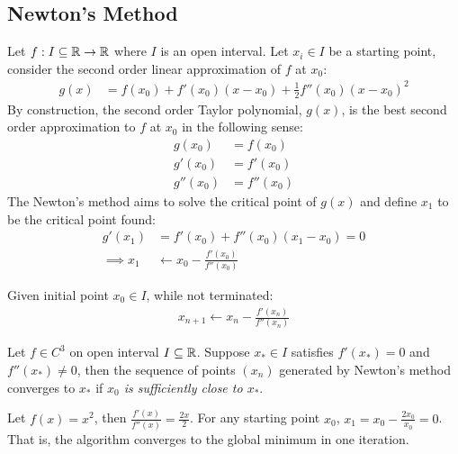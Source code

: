 \documentclass{article}
\begin{document}
	\subsection{Newton's Method}
	\begin{example}
		Let $f: I \subseteq \mathbb{R} \to \mathbb{R}$ where $I$ is an open interval. Let $x_i \in I$ be a starting point, consider the second order linear approximation of $f$ at $x_0$:
		\begin{align}
			g(x) &= f(x_0) + f'(x_0) (x - x_0) + \frac{1}{2} f''(x_0) (x - x_0)^2
		\end{align}
		By construction, the second order Taylor polynomial, $g(x)$, is the best second order approximation to $f$ at $x_0$ in the following sense:
		\begin{align}
			g(x_0) &= f(x_0) \\
			g'(x_0) &= f'(x_0) \\
			g''(x_0) &= f''(x_0)
		\end{align}
		The Newton's method aims to solve the critical point of $g(x)$ and define $x_1$ to be the critical point found:
		\begin{align}
			g'(x_1) &= f'(x_0) + f''(x_0) (x_1 - x_0) = 0 \\
			\implies x_1 &\leftarrow x_0 - \frac{f'(x_0)}{f''(x_0)}
		\end{align}
	\end{example}
	
	\begin{algorithm}
		Given initial point $x_0 \in I$, while not terminated:
		\begin{align}
			x_{n+1} \leftarrow x_n - \frac{f'(x_n)}{f''(x_n)}
		\end{align}
	\end{algorithm}
	
	\begin{theorem}
		Let $f \in C^3$ on open interval $I \subseteq \mathbb{R}$. Suppose $x_* \in I$ satisfies $f'(x_*) = 0$ and $f''(x_*) \neq 0$, then the sequence of points $(x_n)$ generated by Newton's method converges to $x_*$ if \emph{$x_0$ is sufficiently close to $x_*$}.
	\end{theorem}
	
	\begin{example}
		Let $f(x) = x^2$, then $\frac{f'(x)}{f''(x)} = \frac{2x}{2}$. For any starting point $x_0$, $x_1 = x_0 - \frac{2x_0}{x_0} = 0$. That is, the algorithm converges to the global minimum in one iteration.
	\end{example}
	
\end{document}
